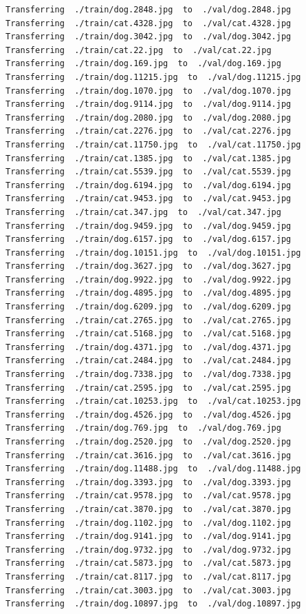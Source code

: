 \documentclass[]{book}
\theoremstyle{definition}
\theoremstyle{definition}
\theoremstyle{definition}
\theoremstyle{remark}
\begin{document}
\begin{verbatim}
Transferring  ./train/dog.2848.jpg  to  ./val/dog.2848.jpg
Transferring  ./train/cat.4328.jpg  to  ./val/cat.4328.jpg
Transferring  ./train/dog.3042.jpg  to  ./val/dog.3042.jpg
Transferring  ./train/cat.22.jpg  to  ./val/cat.22.jpg
Transferring  ./train/dog.169.jpg  to  ./val/dog.169.jpg
Transferring  ./train/dog.11215.jpg  to  ./val/dog.11215.jpg
Transferring  ./train/dog.1070.jpg  to  ./val/dog.1070.jpg
Transferring  ./train/dog.9114.jpg  to  ./val/dog.9114.jpg
Transferring  ./train/dog.2080.jpg  to  ./val/dog.2080.jpg
Transferring  ./train/cat.2276.jpg  to  ./val/cat.2276.jpg
Transferring  ./train/cat.11750.jpg  to  ./val/cat.11750.jpg
Transferring  ./train/cat.1385.jpg  to  ./val/cat.1385.jpg
Transferring  ./train/cat.5539.jpg  to  ./val/cat.5539.jpg
Transferring  ./train/dog.6194.jpg  to  ./val/dog.6194.jpg
Transferring  ./train/cat.9453.jpg  to  ./val/cat.9453.jpg
Transferring  ./train/cat.347.jpg  to  ./val/cat.347.jpg
Transferring  ./train/dog.9459.jpg  to  ./val/dog.9459.jpg
Transferring  ./train/dog.6157.jpg  to  ./val/dog.6157.jpg
Transferring  ./train/dog.10151.jpg  to  ./val/dog.10151.jpg
Transferring  ./train/dog.3627.jpg  to  ./val/dog.3627.jpg
Transferring  ./train/dog.9922.jpg  to  ./val/dog.9922.jpg
Transferring  ./train/dog.4895.jpg  to  ./val/dog.4895.jpg
Transferring  ./train/dog.6209.jpg  to  ./val/dog.6209.jpg
Transferring  ./train/cat.2765.jpg  to  ./val/cat.2765.jpg
Transferring  ./train/cat.5168.jpg  to  ./val/cat.5168.jpg
Transferring  ./train/dog.4371.jpg  to  ./val/dog.4371.jpg
Transferring  ./train/cat.2484.jpg  to  ./val/cat.2484.jpg
Transferring  ./train/dog.7338.jpg  to  ./val/dog.7338.jpg
Transferring  ./train/cat.2595.jpg  to  ./val/cat.2595.jpg
Transferring  ./train/cat.10253.jpg  to  ./val/cat.10253.jpg
Transferring  ./train/dog.4526.jpg  to  ./val/dog.4526.jpg
Transferring  ./train/dog.769.jpg  to  ./val/dog.769.jpg
Transferring  ./train/dog.2520.jpg  to  ./val/dog.2520.jpg
Transferring  ./train/cat.3616.jpg  to  ./val/cat.3616.jpg
Transferring  ./train/dog.11488.jpg  to  ./val/dog.11488.jpg
Transferring  ./train/dog.3393.jpg  to  ./val/dog.3393.jpg
Transferring  ./train/cat.9578.jpg  to  ./val/cat.9578.jpg
Transferring  ./train/cat.3870.jpg  to  ./val/cat.3870.jpg
Transferring  ./train/dog.1102.jpg  to  ./val/dog.1102.jpg
Transferring  ./train/dog.9141.jpg  to  ./val/dog.9141.jpg
Transferring  ./train/dog.9732.jpg  to  ./val/dog.9732.jpg
Transferring  ./train/cat.5873.jpg  to  ./val/cat.5873.jpg
Transferring  ./train/cat.8117.jpg  to  ./val/cat.8117.jpg
Transferring  ./train/cat.3003.jpg  to  ./val/cat.3003.jpg
Transferring  ./train/dog.10897.jpg  to  ./val/dog.10897.jpg

\end{verbatim}
\end{document}
